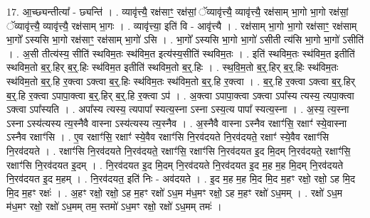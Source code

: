 \documentclass[17pt]{extarticle}
\begin{document}
17. आ॒च्छ्यन्तीत्या᳚ - छ्यन्ति॑ । . व्यावृ॑त्त्यै॒ रक्ष॑साꣳ॒॒ रक्ष॑सां॒ ॅव्यावृ॑त्त्यै॒ व्यावृ॑त्त्यै॒ रक्ष॑साम् भा॒गो भा॒गो रक्ष॑सां॒ ॅव्यावृ॑त्त्यै॒ व्यावृ॑त्त्यै॒ रक्ष॑साम् भा॒गः । . व्यावृ॑त्त्या॒ इति॑ वि - आवृ॑त्त्यै । . रक्ष॑साम् भा॒गो भा॒गो रक्ष॑साꣳ॒॒ रक्ष॑साम् भा॒गो᳚ ऽस्यसि भा॒गो रक्ष॑साꣳ॒॒ रक्ष॑साम् भा॒गो॑ ऽसि । . भा॒गो᳚ ऽस्यसि भा॒गो भा॒गो॑ ऽसीती त्य॑सि भा॒गो भा॒गो॑ ऽसीति॑ । . अ॒सी तीत्य॑स्य॒ सीति॑ स्थविम॒तः स्थ॑विम॒त इत्य॑स्य॒सीति॑ स्थविम॒तः । . इति॑ स्थविम॒तः स्थ॑विम॒त इतीति॑ स्थविम॒तो ब॒र्॒.हिर् ब॒र्॒.हिः स्थ॑विम॒त इतीति॑ स्थविम॒तो ब॒र्॒.हिः । . स्थ॒वि॒म॒तो ब॒र्॒.हिर् ब॒र्॒.हिः स्थ॑विम॒तः स्थ॑विम॒तो ब॒र्॒.हि र॒क्त्वा ऽक्त्वा ब॒र्॒.हिः स्थ॑विम॒तः स्थ॑विम॒तो ब॒र्॒.हि र॒क्त्वा । . ब॒र्॒.हि र॒क्त्वा ऽक्त्वा ब॒र्॒.हिर् ब॒र्॒.हि र॒क्त्वा ऽपापा॒क्त्वा ब॒र्॒.हिर् ब॒र्॒.हि र॒क्त्वा ऽप॑ । . अ॒क्त्वा ऽपापा॒क्त्वा ऽक्त्वा ऽपा᳚स्य त्यस्य॒ त्यपा॒क्त्वा ऽक्त्वा ऽपा᳚स्यति । . अपा᳚स्य त्यस्य॒ त्यपापा᳚ स्यत्य॒स्ना ऽस्ना ऽस्य॒त्य पापा᳚ स्यत्य॒स्ना । . अ॒स्य॒ त्य॒स्ना ऽस्ना ऽस्य॑त्यस्य त्य॒स्नैवै वास्ना ऽस्य॑त्यस्य त्य॒स्नैव । . अ॒स्नैवै वास्ना ऽस्नैव रक्षाꣳ॑सि॒ रक्षाꣳ॑ स्ये॒वास्ना ऽस्नैव रक्षाꣳ॑सि । . ए॒व रक्षाꣳ॑सि॒ रक्षाꣳ॑ स्ये॒वैव रक्षाꣳ॑सि नि॒रव॑दयते नि॒रव॑दयते॒ रक्षाꣳ॑ स्ये॒वैव रक्षाꣳ॑सि नि॒रव॑दयते । . रक्षाꣳ॑सि नि॒रव॑दयते नि॒रव॑दयते॒ रक्षाꣳ॑सि॒ रक्षाꣳ॑सि नि॒रव॑दयत इ॒द मि॒दम् नि॒रव॑दयते॒ रक्षाꣳ॑सि॒ रक्षाꣳ॑सि नि॒रव॑दयत इ॒दम् । . नि॒रव॑दयत इ॒द मि॒दम् नि॒रव॑दयते नि॒रव॑दयत इ॒द म॒ह म॒ह मि॒दम् नि॒रव॑दयते नि॒रव॑दयत इ॒द म॒हम् । . नि॒रव॑दयत॒ इति॑ निः - अव॑दयते । . इ॒द म॒ह म॒ह मि॒द मि॒द म॒हꣳ रक्षो॒ रक्षो॒ ऽह मि॒द मि॒द म॒हꣳ रक्षः॑ । . अ॒हꣳ रक्षो॒ रक्षो॒ ऽह म॒हꣳ रक्षो॑ ऽध॒म म॑ध॒मꣳ रक्षो॒ ऽह म॒हꣳ रक्षो॑ ऽध॒मम् । . रक्षो॑ ऽध॒म म॑ध॒मꣳ रक्षो॒ रक्षो॑ ऽध॒मम् तम॒ स्तमो॑ ऽध॒मꣳ रक्षो॒ रक्षो॑ ऽध॒मम् तमः॑ । \newline
\end{document}
